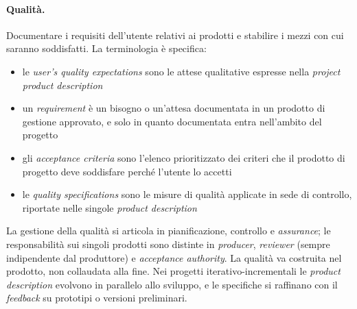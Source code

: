 \paragraph{Qualit\`a.} Documentare i requisiti dell'utente relativi ai prodotti
e stabilire i mezzi con cui saranno soddisfatti. La terminologia \`e specifica:
\begin {itemize}
\item le \emph{user's quality expectations} sono le attese qualitative espresse
nella \emph{project product description}
\item un \emph{requirement} \`e un bisogno o un'attesa documentata in un
prodotto di gestione approvato, e solo in quanto documentata entra nell'ambito
del progetto
\item gli \emph{acceptance criteria} sono l'elenco prioritizzato dei criteri che
il prodotto di progetto deve soddisfare perch\'e l'utente lo accetti
\item le \emph{quality specifications} sono le misure di qualit\`a applicate in
sede di controllo, riportate nelle singole \emph{product description}
\end {itemize}
La gestione della qualit\`a si articola in pianificazione, controllo e
\emph{assurance}; le responsabilit\`a sui singoli prodotti sono distinte in
\emph{producer}, \emph{reviewer} (sempre indipendente dal produttore) e
\emph{acceptance authority}. La qualit\`a va costruita nel prodotto, non
collaudata alla fine. Nei progetti iterativo-incrementali le \emph{product
description} evolvono in parallelo allo sviluppo, e le specifiche si raffinano
con il \emph{feedback} su prototipi o versioni preliminari.

